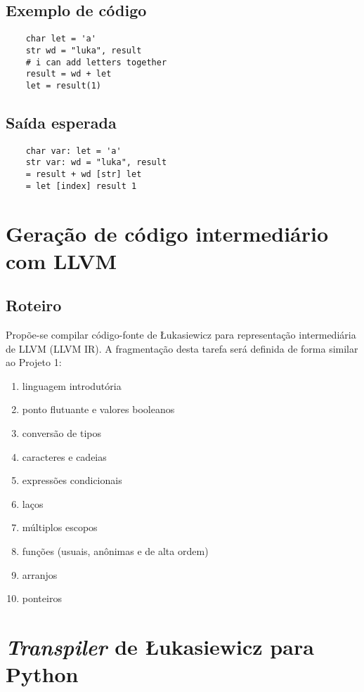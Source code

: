 \documentclass{article}
\newenvironment{smallenum}{
    \vspace{-1mm}
    \begin{enumerate}[label=\roman*.]
    \setlength{\parskip}{0pt}
    \setlength{\itemsep}{2pt}
}{
    \vspace{-2mm}
    \end{enumerate}
}
\begin{document}
\subsection{Exemplo de código}

\begin{verbatim}
    char let = 'a'
    str wd = "luka", result
    # i can add letters together
    result = wd + let
    let = result(1)
\end{verbatim}

\subsection{Saída esperada}

\begin{verbatim}
    char var: let = 'a'
    str var: wd = "luka", result
    = result + wd [str] let
    = let [index] result 1
\end{verbatim}

\section{Geração de código intermediário com LLVM}

\subsection{Roteiro}
Propõe-se compilar código-fonte de Łukasiewicz para representação intermediária
de LLVM (LLVM IR). A fragmentação desta tarefa será definida de forma similar
ao Projeto 1:

\begin{smallenum}
    \item linguagem introdutória
    \item ponto flutuante e valores booleanos
    \item conversão de tipos
    \item caracteres e cadeias
    \item expressões condicionais
    \item laços
    \item múltiplos escopos
    \item funções (usuais, anônimas e de alta ordem)
    \item arranjos
    \item ponteiros
\end{smallenum}

\section{\emph{Transpiler} de Łukasiewicz para Python}
\end{document}
